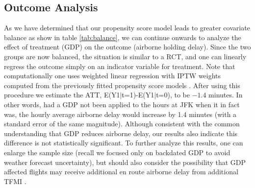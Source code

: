 \documentclass[conference]{IEEEtran}
\begin{document}
\subsection{Outcome Analysis}
As we have determined that our propensity score model leads to greater covariate balance as show in table \ref{tab:balance}, we can continue onwards to analyze the effect of treatment (GDP) on the outcome (airborne holding delay). Since the two groups are now balanced, the situation is similar to a RCT, and one can linearly regress the outcome simply on an indicator variable for treatment. Note that computationally one uses weighted linear regression with IPTW weights computed from the previously fitted propensity score models \cite{ridgeway2015toolkit}. After using this procedure we estimate the ATT, E(Y1$|$t=1)-E(Y1$|$t=0), to be $-1.4$ minutes.  In other words, had a GDP not been applied to the hours at JFK when it in fact was, the hourly average airborne delay would increase by 1.4 minutes (with a standard error of the same magnitude).  Although consistent with the common understanding that GDP reduces airborne delay, our results also indicate this difference is not statistically significant.  To further analyze this results, one can enlarge the sample size (recall we focused only on backdated GDP to avoid weather forecast uncertainty), but should also consider the possibility that GDP affected flights may receive additional en route airborne delay from additional TFMI \cite{bilimoria2016analysis}. 


\end{document}
